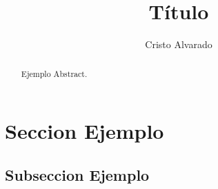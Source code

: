 \documentclass[12pt]{article}
\theoremstyle{largebreak}
\begin{document}
    \setlength{\parskip}{5pt}
    \setlength{\parindent}{12pt}
    \title{Título}
    \author{Cristo Alvarado}
    \maketitle

    \begin{abstract}
        Ejemplo Abstract.
    \end{abstract}
    
    \tableofcontents

    \lstlistoflistings

    \section{Seccion Ejemplo}

    \subsection{Subseccion Ejemplo}
\end{document}
